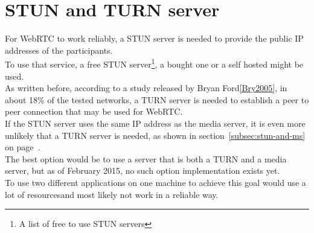 \documentclass[../../../thesis.tex]{subfiles}
\begin{document}
\section{STUN and TURN server}
For WebRTC to work reliably, a STUN server is needed to provide the public IP addresses of the participants.\\
To use that service, a free STUN server\footnote{A list of free to use STUN servers\cite{free-stun-servers}}, a bought one or a self hosted might be used.\\
As written before, according to a study released by Bryan Ford\ref{Bry2005}, in about 18\% of the tested networks, a TURN server is needed to establish a peer to peer connection that may be used for WebRTC.\\
If the STUN server uses the same IP address as the media server, it is even more unlikely that a TURN server is needed, as shown in section~\ref{subsec:stun-and-ms} on page~\pageref{subsec:stun-and-ms}.\\

The best option would be to use a server that is both a TURN and a media server, but as of February 2015, no such option implementation exists yet.\\
To use two different applications on one machine to achieve this goal would use a lot of resources\footnotemark and most likely not work in a reliable way.
\end{document}

